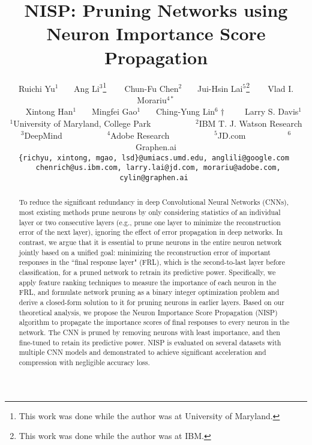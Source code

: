 \documentclass[10pt,twocolumn,letterpaper]{article}
\begin{document}
\title{NISP: Pruning Networks using Neuron Importance Score Propagation}




\author{Ruichi Yu$^{1}$ ~~~Ang  Li$^3$\thanks{This work was done while the author was at University of Maryland.}
~~~ Chun-Fu Chen$^2$~~~ Jui-Hsin Lai$^5$\thanks{This work was done while the author was at IBM.}  ~~~ Vlad I. Morariu$^{4*}$ \\
~~~ Xintong Han$^1$~~~ Mingfei Gao$^1$ ~~~Ching-Yung Lin$^6\dag$ ~~~ Larry S. Davis$^1$\\
$^1$University of Maryland, College Park ~~~~~~~~~~$^2$IBM T. J. Watson Research  \\
$^3$DeepMind  ~~~~~~~~~~$^4$Adobe Research ~~~~~~~~~~$^5$JD.com~~~~~~~~~~$^6$Graphen.ai\\
{\tt\small {\{richyu, xintong, mgao, lsd\}@umiacs.umd.edu}, anglili@google.com
}
\\
{\tt\small { chenrich@us.ibm.com}, larry.lai@jd.com, morariu@adobe.com, cylin@graphen.ai
}
}

\maketitle

\begin{abstract}
To reduce the significant redundancy in deep Convolutional Neural Networks (CNNs), most existing methods prune neurons by only considering statistics of an individual layer or two consecutive layers (e.g., prune one layer to minimize the reconstruction error of the next layer), ignoring the effect of error propagation in deep networks.
In contrast, we argue that it is essential to prune neurons in the entire neuron network jointly based on a unified goal: minimizing the reconstruction error of important responses in the ``final response layer" (FRL), which is the second-to-last layer before classification, for a pruned network to retrain its predictive power.
Specifically, we apply feature ranking techniques to measure the importance of each neuron in the FRL, and formulate network pruning as a binary integer optimization problem and derive a closed-form solution to it for pruning neurons in earlier layers. Based on our theoretical analysis, we propose the Neuron Importance Score Propagation (NISP) algorithm to propagate the importance scores of final responses to every neuron in the network. The CNN is pruned by removing neurons with least importance, and then fine-tuned to retain its predictive power.
NISP is evaluated on several datasets with multiple CNN models and demonstrated to achieve significant acceleration and compression with negligible accuracy loss. 
\end{abstract}
\end{document}
